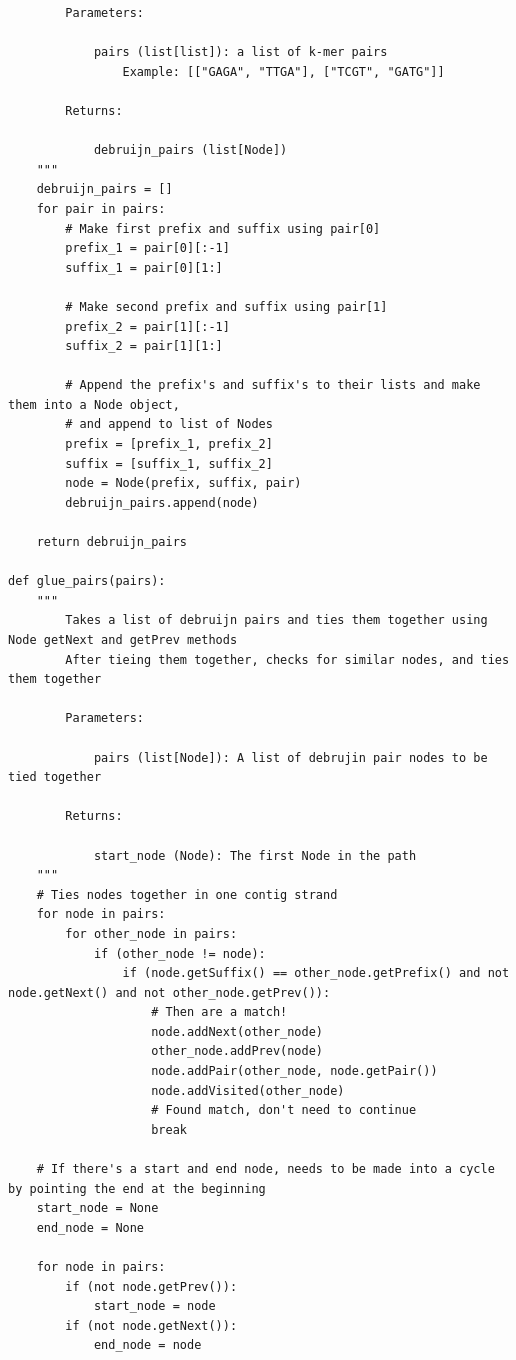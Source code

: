 \documentclass{article}
\begin{document}
\begin{lstlisting}
        Parameters:

            pairs (list[list]): a list of k-mer pairs
                Example: [["GAGA", "TTGA"], ["TCGT", "GATG"]]

        Returns:

            debruijn_pairs (list[Node])
    """
    debruijn_pairs = []
    for pair in pairs:
        # Make first prefix and suffix using pair[0]
        prefix_1 = pair[0][:-1]
        suffix_1 = pair[0][1:]

        # Make second prefix and suffix using pair[1]
        prefix_2 = pair[1][:-1]
        suffix_2 = pair[1][1:]

        # Append the prefix's and suffix's to their lists and make them into a Node object,
        # and append to list of Nodes
        prefix = [prefix_1, prefix_2]
        suffix = [suffix_1, suffix_2]
        node = Node(prefix, suffix, pair)
        debruijn_pairs.append(node)

    return debruijn_pairs

def glue_pairs(pairs):
    """
        Takes a list of debruijn pairs and ties them together using Node getNext and getPrev methods
        After tieing them together, checks for similar nodes, and ties them together

        Parameters:

            pairs (list[Node]): A list of debrujin pair nodes to be tied together

        Returns:

            start_node (Node): The first Node in the path
    """
    # Ties nodes together in one contig strand
    for node in pairs:
        for other_node in pairs:
            if (other_node != node):
                if (node.getSuffix() == other_node.getPrefix() and not node.getNext() and not other_node.getPrev()):
                    # Then are a match!
                    node.addNext(other_node)
                    other_node.addPrev(node)
                    node.addPair(other_node, node.getPair())
                    node.addVisited(other_node)
                    # Found match, don't need to continue
                    break

    # If there's a start and end node, needs to be made into a cycle by pointing the end at the beginning
    start_node = None
    end_node = None

    for node in pairs:
        if (not node.getPrev()):
            start_node = node
        if (not node.getNext()):
            end_node = node


\end{lstlisting}
\end{document}
